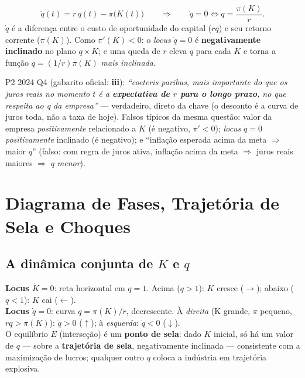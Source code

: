 \documentclass[12pt, a4paper]{article}
\begin{document}
\begin{formulabox}[title={Relação de consistência (locus $\dot q = 0$)}]
\[
\dot{q}(t) = r\,q(t) - \pi\bigl(K(t)\bigr)
\qquad\Longrightarrow\qquad
\dot q = 0 \iff q = \frac{\pi(K)}{r}.
\]
$\dot q$ é a diferença entre o custo de oportunidade do capital ($rq$) e seu
retorno corrente ($\pi(K)$). Como $\pi'(K)<0$: o \emph{locus} $\dot q = 0$ é
\textbf{negativamente inclinado} no plano $q \times K$; e uma queda de $r$
eleva $q$ para cada $K$ e torna a função $q=(1/r)\pi(K)$ \emph{mais
inclinada}.
\end{formulabox}

\begin{provabox}[title={Como cai na prova}]
P2 2024 Q4 (gabarito oficial: \textbf{iii}): \emph{``coeteris paribus, mais
importante do que os juros reais no momento $t$ é a \textbf{expectativa de $r$
para o longo prazo}, no que respeita ao q da empresa''} --- verdadeiro, direto
da chave (o desconto é a curva de juros toda, não a taxa de hoje). Falsos
típicos da mesma questão: valor da empresa \emph{positivamente} relacionado a
$K$ (é negativo, $\pi'<0$); \emph{locus} $\dot q=0$ \emph{positivamente}
inclinado (é negativo); e ``inflação esperada acima da meta $\Rightarrow$
maior $q$'' (falso: com regra de juros ativa, inflação acima da meta
$\Rightarrow$ juros reais maiores $\Rightarrow$ $q$ \emph{menor}).
\end{provabox}

\section{Diagrama de Fases, Trajetória de Sela e Choques}

\subsection{A dinâmica conjunta de $K$ e $q$}

\begin{resultbox}[title={Os dois loci e as setas de movimento}]
\textbf{Locus $\dot K = 0$}: reta horizontal em $q = 1$.
Acima ($q>1$): $K$ cresce ($\rightarrow$); abaixo ($q<1$): $K$ cai
($\leftarrow$).\\[0.3em]
\textbf{Locus $\dot q = 0$}: curva $q = \pi(K)/r$, decrescente.
À \emph{direita} (K grande, $\pi$ pequeno, $rq > \pi(K)$): $\dot q > 0$
($\uparrow$); à \emph{esquerda}: $\dot q < 0$ ($\downarrow$).\\[0.3em]
O equilíbrio $E$ (interseção) é um \textbf{ponto de sela}: dado $K$ inicial,
só há um valor de $q$ --- sobre a \textbf{trajetória de sela}, negativamente
inclinada --- consistente com a maximização de lucros; qualquer outro $q$
coloca a indústria em trajetória explosiva.
\end{resultbox}
\end{document}
